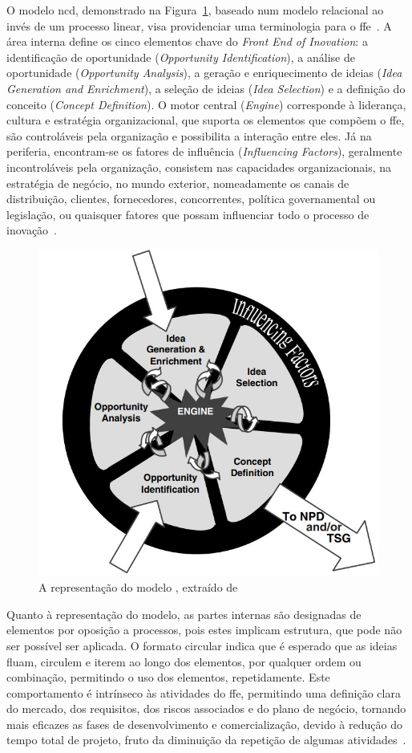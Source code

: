 O modelo \gls{ncd}, demonstrado na Figura~\ref{fig:ncd_model}, baseado num modelo relacional ao invés de um processo linear, visa providenciar uma terminologia para o \gls{ffe}~\parencite{ffe_effectivemethods_tools_techniques}. A área interna define os cinco elementos chave do \textit{Front End of Inovation}: a identificação de oportunidade (\textit{Opportunity Identification}), a análise de oportunidade (\textit{Opportunity Analysis}), a geração e enriquecimento de ideias (\textit{Idea Generation and Enrichment}), a seleção de ideias (\textit{Idea Selection}) e a definição do conceito (\textit{Concept Definition}). O motor central (\textit{Engine}) corresponde à liderança, cultura e estratégia organizacional, que suporta os elementos que compõem o \gls{ffe}, são controláveis pela organização e possibilita a interação entre eles. Já na periferia, encontram-se os fatores de influência (\textit{Influencing Factors}), geralmente incontroláveis pela organização, consistem nas capacidades organizacionais, na estratégia de negócio, no mundo exterior, nomeadamente os canais de distribuição, clientes, fornecedores, concorrentes, política governamental ou legislação, ou quaisquer fatores que possam influenciar todo o processo de inovação~\parencite{ffe_effectivemethods_tools_techniques, providing_clarity_common_language_ffe}.

\begin{figure}[!ht]
    \centering
    \includegraphics[width=.55\textwidth]{appendices/assets/ncd_model.jpg}
    \caption{A representação do modelo , extraído de~\textcite{ffe_effectivemethods_tools_techniques}}
    \label{fig:ncd_model}
\end{figure}

Quanto à representação do modelo, as partes internas são designadas de elementos por oposição a processos, pois estes implicam estrutura, que pode não ser possível ser aplicada. O formato circular indica que é esperado que as ideias fluam, circulem e iterem ao longo dos elementos, por qualquer ordem ou combinação, permitindo o uso dos elementos, repetidamente. Este comportamento é intrínseco às atividades do \gls{ffe}, permitindo uma definição clara do mercado, dos requisitos, dos riscos associados e do plano de negócio, tornando mais eficazes as fases de desenvolvimento e comercialização, devido à redução do tempo total de projeto, fruto da diminuição da repetição de algumas atividades~\parencite{ffe_effectivemethods_tools_techniques}. 

